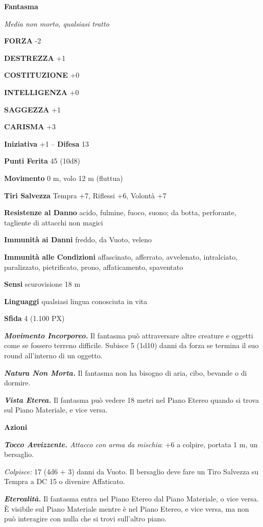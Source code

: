 \begin{multicols}{2}
	\medskip{}\textbf{Fantasma}

	\textit{Media non morto, qualsiasi tratto}

	\textbf{FORZA} -2

	\textbf{DESTREZZA} +1

	\textbf{COSTITUZIONE} +0

	\textbf{INTELLIGENZA} +0

	\textbf{SAGGEZZA} +1

	\textbf{CARISMA} +3

	\textbf{Iniziativa} +1 -- \textbf{Difesa} 13

	\textbf{Punti Ferita} 45 (10d8)

	\textbf{Movimento} 0 m, volo 12 m (fluttua)

	\textbf{Tiri Salvezza} Tempra +7, Riflessi +6, Volontà +7

	\textbf{Resistenze al Danno} acido, fulmine, fuoco, suono; da botta, perforante, tagliente di attacchi non magici

	\textbf{Immunità ai Danni} freddo, da Vuoto, veleno

	\textbf{Immunità alle Condizioni} affascinato, afferrato, avvelenato, intralciato, paralizzato, pietrificato, prono, affaticamento, spaventato

	\textbf{Sensi} scurovisione 18 m

	\textbf{Linguaggi} qualsiasi lingua conosciuta in vita

	\textbf{Sfida} 4 (1.100 PX)

	\textit{\textbf{Movimento Incorporeo.}} Il fantasma può attraversare altre creature e oggetti come se fossero terreno difficile. Subisce 5 (1d10) danni da forza se termina il suo round all'interno di un oggetto.

	\textit{\textbf{Natura Non Morta.}} Il fantasma non ha bisogno di aria, cibo, bevande o di dormire.

	\textit{\textbf{Vista Eterea.}} Il fantasma può vedere 18 metri nel Piano Etereo quando si trova sul Piano Materiale, e vice versa.

	\textbf{Azioni}

	\textit{\textbf{Tocco Avvizzente.} Attacco con arma da mischia}: +6 a colpire, portata 1 m, un bersaglio.

	\textit{Colpisce:} 17 (4d6 + 3) danni da Vuoto. Il bersaglio deve fare un Tiro Salvezza su Tempra a DC 15 o divenire Affaticato.

	\textit{\textbf{Eterealità.}} Il fantasma entra nel Piano Etereo dal Piano Materiale, o vice versa. È visibile sul Piano Materiale mentre è nel Piano Etereo, e vice versa, ma non può interagire con nulla che si trovi sull'altro piano.


\end{multicols}
